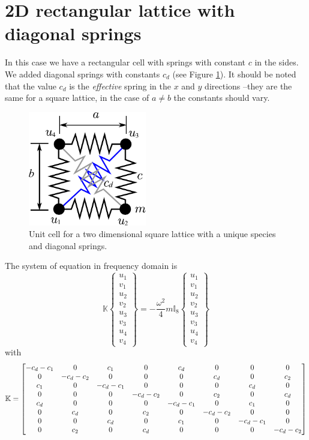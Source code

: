 \documentclass[12pt,letterpaper]{article}
\begin{document}
\section{2D rectangular lattice with diagonal springs}
In this case we have a rectangular cell with springs with constant $c$ in the sides. We added diagonal springs with constants $c_d$ (see Figure \ref{fig:square-diag}). It should be noted that the value $c_d$ is the \emph{effective} spring in the $x$ and $y$ directions --they are the same for a square lattice, in the case of $a\neq b$ the constants should vary.
\begin{figure}[h]
\centering
\includegraphics[height=5cm]{img/spring-square-diag.pdf} 
\caption{Unit cell for a two dimensional square lattice with a unique species and diagonal springs.}\label{fig:square-diag}
\end{figure}

The system of equation in frequency domain is
\begin{equation}
\mathbb{K}
\begin{Bmatrix}
u_1 \\ 
v_1 \\ 
u_2 \\ 
v_2 \\ 
u_3 \\ 
v_3 \\ 
u_4 \\ 
v_4
\end{Bmatrix} = -\frac{\omega^2}{4}m \mathbb{I}_8
\begin{Bmatrix}
u_1 \\ 
v_1 \\ 
u_2 \\ 
v_2 \\ 
u_3 \\ 
v_3 \\ 
u_4 \\ 
v_4
\end{Bmatrix}
\end{equation}
with
\[\mathbb{K} = \begin{bmatrix}
-c_{d}-c_{1} & 0 & c_{1} & 0 & c_{d} & 0 & 0 & 0\cr
0 & -c_{d}-c_{2} & 0 & 0 & 0 & c_{d} & 0 & c_{2}\cr
c_{1} & 0 & -c_{d}-c_{1} & 0 & 0 & 0 & c_{d} & 0\cr
0 & 0 & 0 & -c_{d}-c_{2} & 0 & c_{2} & 0 & c_{d}\cr
c_{d} & 0 & 0 & 0 & -c_{d}-c_{1} & 0 & c_{1} & 0\cr
0 & c_{d} & 0 & c_{2} & 0 & -c_{d}-c_{2} & 0 & 0\cr
0 & 0 & c_{d} & 0 & c_{1} & 0 & -c_{d}-c_{1} & 0\cr
0 & c_{2} & 0 & c_{d} & 0 & 0 & 0 & -c_{d}-c_{2}\end{bmatrix} \]
\end{document}
